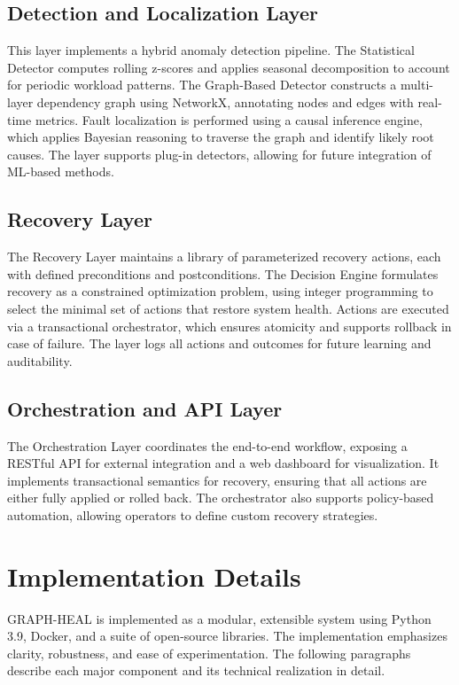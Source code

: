 \documentclass[11pt,twocolumn]{article}
\begin{document}
\subsection{Detection and Localization Layer}
This layer implements a hybrid anomaly detection pipeline. The Statistical Detector computes rolling z-scores and applies seasonal decomposition to account for periodic workload patterns. The Graph-Based Detector constructs a multi-layer dependency graph using NetworkX, annotating nodes and edges with real-time metrics. Fault localization is performed using a causal inference engine, which applies Bayesian reasoning to traverse the graph and identify likely root causes. The layer supports plug-in detectors, allowing for future integration of ML-based methods.

\subsection{ Recovery Layer} The Recovery Layer maintains a library of parameterized recovery actions, each with defined preconditions and postconditions. The Decision Engine formulates recovery as a constrained optimization problem, using integer programming to select the minimal set of actions that restore system health. Actions are executed via a transactional orchestrator, which ensures atomicity and supports rollback in case of failure. The layer logs all actions and outcomes for future learning and auditability.

\subsection{Orchestration and API Layer}
The Orchestration Layer coordinates the end-to-end workflow, exposing a RESTful API for external integration and a web dashboard for visualization. It implements transactional semantics for recovery, ensuring that all actions are either fully applied or rolled back. The orchestrator also supports policy-based automation, allowing operators to define custom recovery strategies.



\section{Implementation Details}
GRAPH-HEAL is implemented as a modular, extensible system using Python 3.9, Docker, and a suite of open-source libraries. The implementation emphasizes clarity, robustness, and ease of experimentation. The following paragraphs describe each major component and its technical realization in detail.
\end{document}
